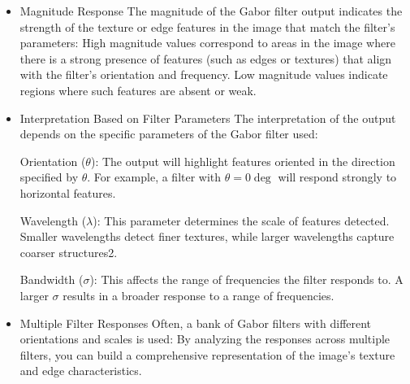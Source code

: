 \begin{itemize}
    \item Magnitude Response
The magnitude of the Gabor filter output indicates the strength of the texture or edge features in the image that match the filter's parameters:
High magnitude values correspond to areas in the image where there is a strong presence of features (such as edges or textures) that align with the filter's orientation and frequency. Low magnitude values indicate regions where such features are absent or weak.
    \item Interpretation Based on Filter Parameters
The interpretation of the output depends on the specific parameters of the Gabor filter used:

Orientation ($\theta$): The output will highlight features oriented in the direction specified by $\theta$. For example, a filter with $\theta = 0\deg$ will respond strongly to horizontal features.

Wavelength ($\lambda$): This parameter determines the scale of features detected. Smaller wavelengths detect finer textures, while larger wavelengths capture coarser structures2.

Bandwidth ($\sigma$): This affects the range of frequencies the filter responds to. A larger $\sigma$ results in a broader response to a range of frequencies.

    \item Multiple Filter Responses
Often, a bank of Gabor filters with different orientations and scales is used:
By analyzing the responses across multiple filters, you can build a comprehensive representation of the image's texture and edge characteristics.
\end{itemize}

\printglossary[type=datacollection,style=twocolumn]
\newpage

\renewcommand{\bibname}{References}

